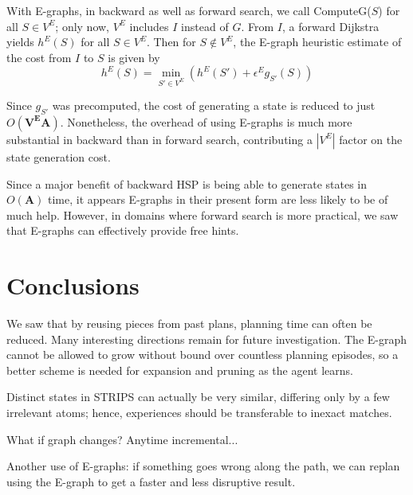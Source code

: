 \documentclass[letterpaper]{article}
\begin{document}
With E-graphs, in backward as well as forward search, we call ComputeG($S$) for all $S\in V^E$; only now, $V^E$ includes $I$ instead of $G$. From $I$, a forward Dijkstra yields $h^E(S)$ for all $S\in V^E$. Then for $S\notin V^E$, the E-graph heuristic estimate of the cost from $I$ to $S$ is given by
\[h^E(S) = \min_{S'\in V^E}\left(h^E(S') + \epsilon^E g_{S'}(S) \right)\]

Since $g_{S'}$ was precomputed, the cost of generating a state is reduced to just $O(\mathbf{V^EA})$. Nonetheless, the overhead of using E-graphs is much more substantial in backward than in forward search, contributing a $|V^E|$ factor on the state generation cost.

Since a major benefit of backward HSP is being able to generate states in $O(\mathbf{A})$ time, it appears E-graphs in their present form are less likely to be of much help. However, in domains where forward search is more practical, we saw that E-graphs can effectively provide free hints.

\section{Conclusions}

We saw that by reusing pieces from past plans, planning time can often be reduced. Many interesting directions remain for future investigation. The E-graph cannot be allowed to grow without bound over countless planning episodes, so a better scheme is needed for expansion and pruning as the agent learns.

Distinct states in STRIPS can actually be very similar, differing only by a few irrelevant atoms; hence, experiences should be transferable to inexact matches.

What if graph changes? Anytime incremental...

Another use of E-graphs: if something goes wrong along the path, we can replan using the E-graph to get a faster and less disruptive result.



\end{document}
